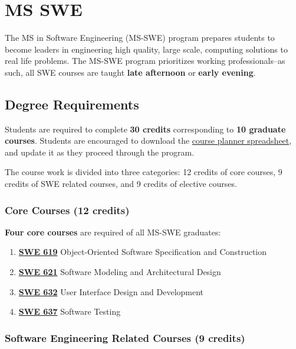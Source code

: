 \documentclass[oneside,11pt]{memoir}
\begin{document}
\chapter{MS SWE}


The MS in Software Engineering (MS-SWE) program prepares students to become leaders in engineering high quality, large scale, computing solutions to real life problems. The MS-SWE program prioritizes working professionals--as such, all SWE courses are taught \textbf{late afternoon} or \textbf{early evening}.

\section{Degree Requirements}

Students are required to complete \textbf{30 credits} corresponding to \textbf{10 graduate courses}. Students are encouraged to download the \href{https://cs.gmu.edu/media/uploads/programs/graduate/masters/ms-swe-courseplanner.xlsx}{course planner spreadsheet}, and update it as they proceed through the program.

The course work is divided into three categories: 12 credits of core courses, 9 credits of SWE related courses, and 9 credits of elective courses.

\subsection{Core Courses (12 credits)}

\textbf{Four core courses} are required of all MS-SWE graduates:

\begin{enumerate}
    \item \href{https://catalog.gmu.edu/search/?P=SWE%20619}{\textbf{SWE 619}} Object-Oriented Software Specification and Construction
    \item \href{https://catalog.gmu.edu/search/?P=SWE%20621}{\textbf{SWE 621}} Software Modeling and Architectural Design
    \item \href{https://catalog.gmu.edu/search/?P=SWE%20632}{\textbf{SWE 632}} User Interface Design and Development
    \item \href{https://catalog.gmu.edu/search/?P=SWE%20637}{\textbf{SWE 637}} Software Testing
\end{enumerate}

\subsection{Software Engineering Related Courses (9 credits)}
\end{document}
